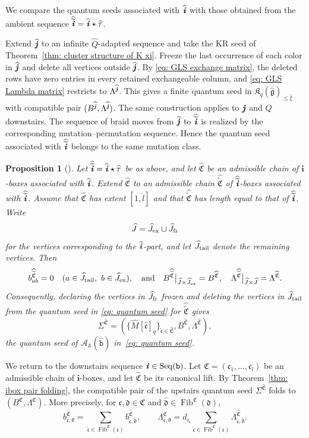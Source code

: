 \documentclass[12pt, leqno]{amsart}
\numberwithin{equation}{section}
\theoremstyle{plain}
\newtheorem{proposition}[lemma]{Proposition}
\theoremstyle{definition}
\newcommand{\hxi}{{\widehat{\xi}}}
\renewcommand{\le}{\leqslant}
\newcommand{\g}{\mathfrak{g}}
\newcommand{\ii}{ \textbf{\textit{i}}}
\newcommand{\jj}{ \textbf{\textit{j}}}
\newcommand{\Fib}{\operatorname{Fib}}
\newcommand{\tii}{{\widetilde{\ii}}}
\newcommand{\htii}{{\widehat{\tii}}}
\newcommand{\hJ}{\widehat{J}}
\newcommand{\hM}{\widehat{M}}
\newcommand{\hQ}{\widehat{Q}}
\newcommand{\hg}{{\widehat{\g}}}
\newcommand{\hl}{\widehat{l}}
\newcommand{\htau}{\widehat{\tau}}
\newcommand{\hii}{{\widehat{\ii}}}
\newcommand{\hjj}{{\widehat{\jj}}}
\newcommand{\frakC}{\mathfrak{C}}
\newcommand{\frakK}{\mathfrak{K}}
\newcommand{\frakc}{\mathfrak{c}}
\newcommand{\frakd}{\mathfrak{d}}
\newcommand{\tfrakC}{\widetilde{\frakC}}
\newcommand{\hfrakC}{\widehat{\frakC}}
\newcommand{\hfrakc}{\widehat{\frakc}}
\newcommand{\hfrakd}{\widehat{\frakd}}
\newcommand{\htfrakC}{\widehat{\tfrakC}}
\newcommand{\bbA}{\mathbb{A}}
\newcommand{\bfi}{\mathbf{i}}
\newcommand{\scrA}{\mathscr{A}}
\newcommand{\ttb}{\mathtt{b}}
\newcommand{\httb}{\widehat{\ttb}}
\newcommand{\qtq}[1][{and}]{\quad\text{{#1}}\quad}
\newcommand{\Seq}{\mathrm{Seq}}
\begin{document}
We compare the quantum seeds associated with $\hii$ with those
obtained from the ambient sequence $\htii=\hii\star\htau$.

Extend $\hjj$ to an infinite $\hQ$-adapted sequence and take
the KR seed of Theorem~\ref{thm: cluster structure of K xi}.
Freeze the last occurrence of each color in $\hjj$ and delete
all vertices outside $\hjj$.
By \eqref{eq: GLS exchange matrix}, the deleted rows have zero
entries in every retained exchangeable column, and
\eqref{eq: GLS Lambda matrix} restricts to $\Lambda^{\hjj}$.
This gives a finite quantum seed in $\frakK_q(\hg)_{\le\hxi}$
with compatible pair $(B^{\hjj},\Lambda^{\hjj})$.
The same construction applies to $\jj$ and $Q$ downstairs.
The sequence of braid moves from $\hjj$ to $\htii$ is realized by
the corresponding mutation--permutation sequence.  Hence  the quantum seed associated with $\htii$ belongs to the same mutation
class.


\begin{proposition}[{\cite[Proposition~8.10]{KKOP25M}}]
\label{prop: cutting positive braid seed}
Let $\htii=\hii\star\htau$ be as above, and let
$\hfrakC$ be an admissible chain of $\bfi$-boxes associated with $\hii$.
Extend $\hfrakC$ to an admissible chain $\htfrakC$ of
$\htii$-boxes associated with $\htii$.  Assume that $\hfrakC$ has extent $[1,\hl]$ and that
$\htfrakC$ has length equal to that of $\htii$.  Write
\[
\hJ=\hJ_{\rm ex}\sqcup\hJ_{\rm fr}
\]
for the vertices corresponding to the $\hii$-part, and let
$\hJ_{\rm tail}$ denote the remaining vertices.  Then
\[
b^{\htfrakC}_{ab}=0 \quad (a\in\hJ_{\rm tail},\ b\in\hJ_{\rm ex}),
\qtq
B^{\htfrakC}\big|_{\hJ\times\hJ_{\rm ex}} = B^{\hfrakC},
\quad
\Lambda^{\htfrakC}\big|_{\hJ\times\hJ} = \Lambda^{\hfrakC}.
\]
Consequently, declaring the vertices in $\hJ_{\rm fr}$ frozen
and deleting the vertices in $\hJ_{\rm tail}$ from  the quantum
seed in \eqref{eq: quantum seed} for $\htfrakC$ gives
\[
\Sigma^{\hfrakC} = \left(\{\hM[\hfrakc]_q\}_{\hfrakc\in\hfrakC},B^{\hfrakC},\Lambda^{\hfrakC}\right),
\]
the quantum seed of $\scrA_{\bbA}(\httb)$ in~\eqref{eq: quantum seed}.
\end{proposition}



We return to the downstairs sequence
$\ii\in\Seq(\ttb)$.  Let
$\frakC=(\frakc_1,\ldots,\frakc_l)$
be an admissible chain of $\bfi$-boxes, and let $\hfrakC$ be its
canonical lift.  By Theorem~\ref{thm: ibox pair folding},
the compatible pair of the upstairs quantum seed
$\Sigma^{\hfrakC}$ folds to
$(B^{\frakC},\Lambda^{\frakC}).$
More precisely, for $\frakc,\frakd\in\frakC$ and
$\hfrakd\in\Fib^{\frakC}(\frakd)$,
\[
b^{\frakC}_{\frakc,\frakd} = \sum_{\hfrakc\in\Fib^{\frakC}(\frakc)} b^{\hfrakC}_{\hfrakc,\hfrakd},
\qquad
\Lambda^{\frakC}_{\frakc,\frakd} = d_{i_{\frakc}} \sum_{\hfrakc\in\Fib^{\frakC}(\frakc)} \Lambda^{\hfrakC}_{\hfrakc,\hfrakd}.
\]
\end{document}
